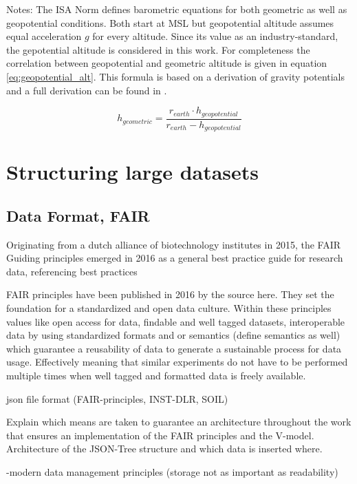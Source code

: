 Notes: The ISA Norm defines barometric equations for both geometric as well as geopotential conditions. Both start at MSL but geopotential altitude assumes equal acceleration $g$ for every altitude. Since its value as an industry-standard, the gepotential altitude is considered in this work. For completeness the correlation between geopotential and geometric altitude is given in equation \ref{eq:geopotential_alt}. This formula is based on a derivation of gravity potentials and a full derivation can be found in \textcite{iso_standard_1975}.


\begin{equation}
    h_{geometric} = \frac{r_{earth} \cdot h_{geopotential}}{r_{earth} - h_{geopotential}}
    \label{eq:geopotential_alt}
\end{equation}
\newpage



\section{Structuring large datasets}

\subsection{Data Format, FAIR}

Originating from a dutch alliance of biotechnology institutes in 2015, the FAIR Guiding principles emerged in 2016 as a general best practice guide for research data, referencing best practices

FAIR principles have been published in 2016 by the source here. They set the foundation for a standardized and open data culture. Within these principles values like open access for data, findable and well tagged datasets, interoperable data by using standardized formats and or semantics (define semantics as well) which guarantee a reusability of data to generate a sustainable process for data usage. Effectively meaning that similar experiments do not have to be performed multiple times when well tagged and formatted data is freely available.


json file format (FAIR-principles, INST-DLR, SOIL)

Explain which means are taken to guarantee an architecture throughout the work that ensures an implementation of the FAIR principles and the V-model.
Architecture of the JSON-Tree structure and which data is inserted where.


-modern data management principles (storage not as important as readability)

